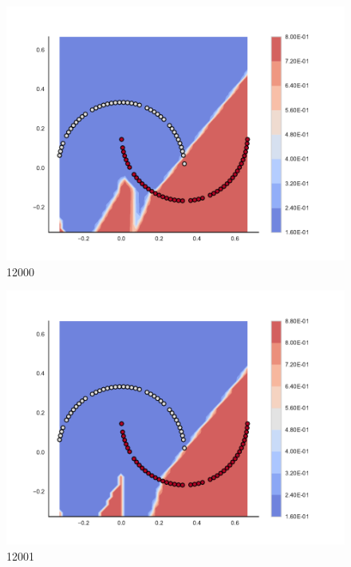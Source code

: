 \begin{subfigure}[b]{0.09\textwidth}
    \includegraphics[clip, trim=2.35cm 1.75cm 4.5cm 0cm,width=\textwidth]{img/convergence/12000.pdf}
    \caption{12000}
    \label{fig:convergence_12000}
\end{subfigure}
%
\begin{subfigure}[b]{0.09\textwidth}
    \includegraphics[clip, trim=2.35cm 1.75cm 4.5cm 0cm,width=\textwidth]{img/convergence/12001.pdf}
    \caption{12001}
    \label{fig:convergence_12001}
\end{subfigure}
%
